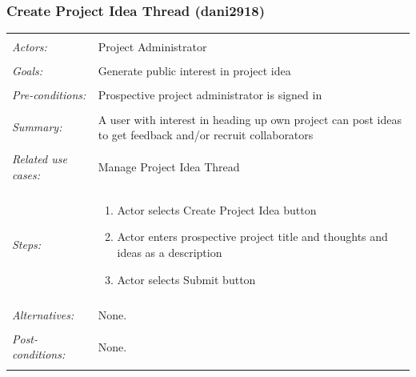 \documentclass[11pt]{report}
\begin{document}
\subsubsection{Create Project Idea Thread (dani2918)}
\begin{tabular}{ p{2cm} p{12cm} }
 \hline
 \\
 \textit{Actors:} & Project Administrator \\ 
 \\
 \textit{Goals:} & Generate public interest in project idea  \\
 \\
 \textit{Pre-conditions:} & Prospective project administrator is signed in  \\
 \\
 \textit{Summary:} &  A user with interest in heading up own project can post ideas to get feedback and/or recruit collaborators \\ 
 \\
 \textit{Related use cases:} & Manage Project Idea Thread \\ 
 \\
 \textit{Steps:} & \begin{enumerate}
  \item Actor selects Create Project Idea button
  \item Actor enters prospective project title and thoughts and ideas as a description
  \item Actor selects Submit button

 \end{enumerate} \\
 \\
 \textit{Alternatives:} & None. \\
 \\
 \textit{Post-conditions:} & None. \\
 \\
\hline
\end{tabular}
\end{document}
